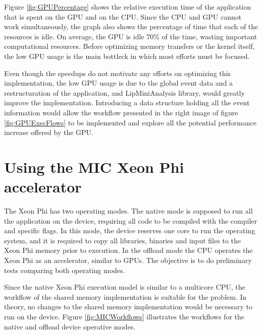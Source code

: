 Figure \ref{fig:GPUPercentage} shows the relative execution time of the application that is spent on the GPU and on the CPU. Since the CPU and GPU cannot work simultaneously, the graph also shows the percentage of time that each of the resources is idle. On average, the GPU is idle 70\% of the time, wasting important computational resources. Before optimizing memory transfers or the kernel itself, the low GPU usage is the main bottleck in which most efforts must be focused.

Even though the speedups do not motivate any efforts on optimizing this implementation, the low GPU usage is due to the global event data and a restructuration of the application, and LipMiniAnalysis library, would greatly improve the implementation. Introducing a data structure holding all the event information would allow the workflow presented in the right image of figure \ref{fig:GPUExecFlows} to be implemented and explore all the potential performance increase offered by the GPU.

\section{Using the \intel MIC Xeon Phi accelerator}
\label{Parallelization:MIC}

The \intel Xeon Phi has two operating modes. The native mode is supposed to run all the application on the device, requiring all code to be compiled with the \intel compiler and specific flags. In this mode, the device reserves one core to run the operating system, and it is required to copy all libraries, binaries and input files to the Xeon Phi memory prior to execution. In the offload mode the CPU operates the Xeon Phi as an accelerator, similar to GPUs. The objective is to do preliminary tests comparing both operating modes.

Since the native Xeon Phi execution model is similar to a multicore CPU, the workflow of the shared memory implementation is suitable for the problem. In theory, no changes to the shared memory implementation would be necessary to run on the device. Figure \ref{fig:MICWorkflows} illustrates the workflows for the native and offload device operative modes.

